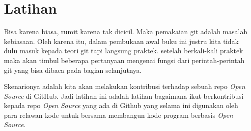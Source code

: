 \section{Latihan}
Bisa karena biasa, rumit karena tak dicicil. Maka pemakaian git adalah masalah kebiasaan. Oleh karena itu, dalam pembukaan awal buku ini justru kita tidak dulu masuk kepada teori git tapi langsung praktek. setelah berkali-kali praktek maka akan timbul beberapa pertanyaan mengenai fungsi dari perintah-perintah git yang bisa dibaca pada bagian selanjutnya.

Skenarionya adalah kita akan melakukan kontribusi terhadap sebuah repo \textit{Open Source} di GitHub. Jadi latihan ini adalah latihan bagaimana ikut berkontribusi kepada repo \textit{Open Source} yang ada di Github yang selama ini digunakan oleh para relawan kode untuk bersama membangun kode program berbasis \textit{Open Source}.
